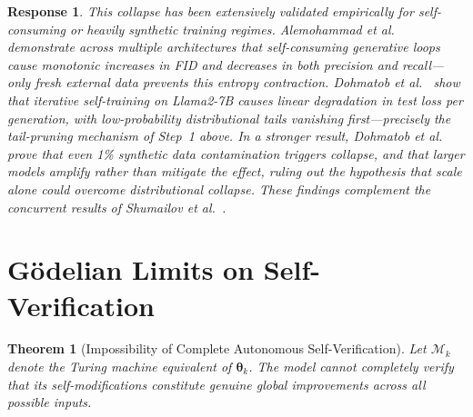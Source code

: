 \documentclass[11pt,a4paper]{article}
\newtheorem{theorem}{Theorem}[section]
\newtheorem{response}{Response}
\begin{document}
\begin{response}
This collapse has been extensively validated empirically for self-consuming or heavily synthetic training regimes. Alemohammad et al.~\cite{alemohammad2023mad} demonstrate across multiple architectures that self-consuming generative loops cause monotonic increases in FID and decreases in both precision and recall---only fresh external data prevents this entropy contraction. Dohmatob et al.~\cite{dohmatob2024tails} show that iterative self-training on Llama2-7B causes linear degradation in test loss per generation, with low-probability distributional tails vanishing first---precisely the tail-pruning mechanism of Step~1 above. In a stronger result, Dohmatob et al.~\cite{dohmatob2024strong} prove that even 1\% synthetic data contamination triggers collapse, and that larger models amplify rather than mitigate the effect, ruling out the hypothesis that scale alone could overcome distributional collapse. These findings complement the concurrent results of Shumailov et al.~\cite{shumailov2024model}.
\end{response}

\section{G\"{o}delian Limits on Self-Verification}

\begin{theorem}[Impossibility of Complete Autonomous Self-Verification]
\label{thm:godel}
Let $\mathcal{M}_k$ denote the Turing machine equivalent of $\bm{\theta}_k$. The model cannot completely verify that its self-modifications constitute genuine global improvements across all possible inputs.
\end{theorem}
\end{document}

